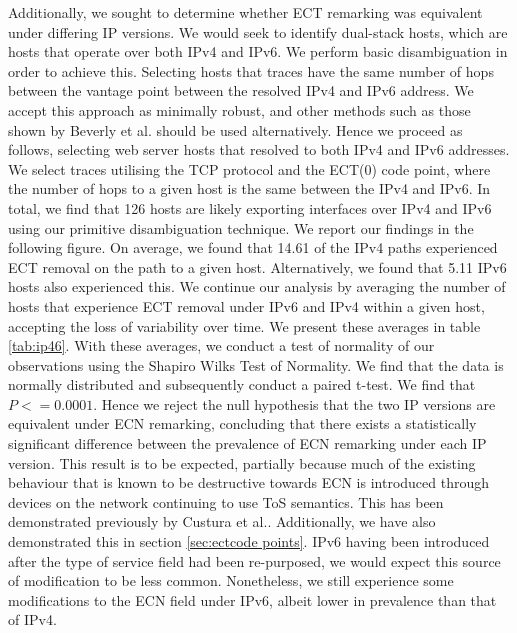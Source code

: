 \documentclass{l4proj}
\begin{document}
Additionally, we sought to determine whether ECT remarking was equivalent under differing IP versions. We would seek to identify dual-stack hosts, which are hosts that operate over both IPv4 and IPv6. We perform basic disambiguation in order to achieve this. Selecting hosts that traces have the same number of hops between the vantage point between the resolved IPv4 and IPv6 address. We accept this approach as minimally robust, and other methods such as those shown by Beverly et al.\cite{mirkovic_server_2015} should be used alternatively. Hence we proceed as follows, selecting web server hosts that resolved to both IPv4 and IPv6 addresses. We select traces utilising the TCP protocol and the ECT(0) code point, where the number of hops to a given host is the same between the IPv4 and IPv6. In total, we find that 126 hosts are likely exporting interfaces over IPv4 and IPv6 using our primitive disambiguation technique. We report our findings in the following figure. On average, we found that 14.61 of the IPv4 paths experienced ECT removal on the path to a given host. Alternatively, we found that 5.11 IPv6 hosts also experienced this. We continue our analysis by averaging the number of hosts that experience ECT removal under IPv6 and IPv4 within a given host, accepting the loss of variability over time. We present these averages in table \ref{tab:ip46}. With these averages, we conduct a test of normality of our observations using the Shapiro Wilks Test of Normality. We find that the data is normally distributed and subsequently conduct a paired t-test. We find that $ P<=0.0001 $. Hence we reject the null hypothesis that the two IP versions are equivalent under ECN remarking, concluding that there exists a statistically significant difference between the prevalence of ECN remarking under each IP version. This result is to be expected, partially because much of the existing behaviour that is known to be destructive towards ECN is introduced through devices on the network continuing to use ToS semantics. This has been demonstrated previously by Custura et al.\cite{custura_exploring_2018}. Additionally, we have also demonstrated this in section \ref{sec:ectcode points}. IPv6 having been introduced after the type of service field had been re-purposed, we would expect this source of modification to be less common. Nonetheless, we still experience some modifications to the ECN field under IPv6, albeit lower in prevalence than that of IPv4.
\end{document}
